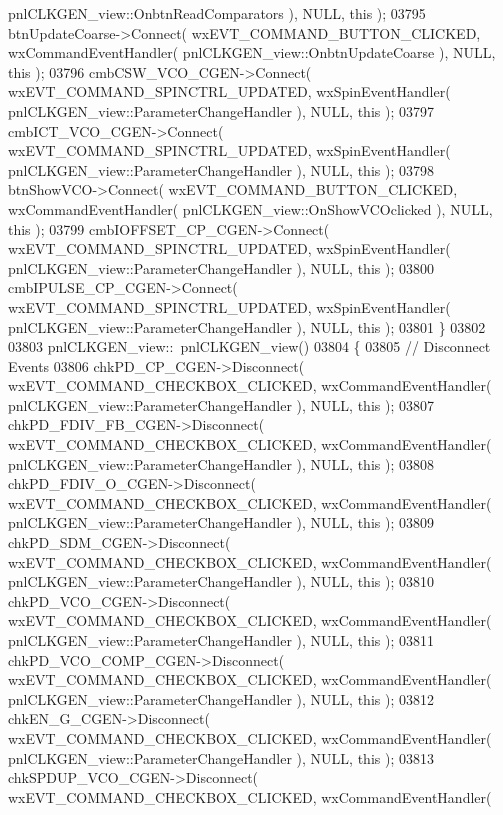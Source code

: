 \begin{DoxyCode}
      pnlCLKGEN_view::OnbtnReadComparators ), NULL, \textcolor{keyword}{this} );
03795     btnUpdateCoarse->Connect( wxEVT\_COMMAND\_BUTTON\_CLICKED, wxCommandEventHandler( 
      pnlCLKGEN_view::OnbtnUpdateCoarse ), NULL, \textcolor{keyword}{this} );
03796     cmbCSW_VCO_CGEN->Connect( wxEVT\_COMMAND\_SPINCTRL\_UPDATED, wxSpinEventHandler( 
      pnlCLKGEN_view::ParameterChangeHandler ), NULL, \textcolor{keyword}{this} );
03797     cmbICT_VCO_CGEN->Connect( wxEVT\_COMMAND\_SPINCTRL\_UPDATED, wxSpinEventHandler( 
      pnlCLKGEN_view::ParameterChangeHandler ), NULL, \textcolor{keyword}{this} );
03798     btnShowVCO->Connect( wxEVT\_COMMAND\_BUTTON\_CLICKED, wxCommandEventHandler( 
      pnlCLKGEN_view::OnShowVCOclicked ), NULL, \textcolor{keyword}{this} );
03799     cmbIOFFSET_CP_CGEN->Connect( wxEVT\_COMMAND\_SPINCTRL\_UPDATED, wxSpinEventHandler( 
      pnlCLKGEN_view::ParameterChangeHandler ), NULL, \textcolor{keyword}{this} );
03800     cmbIPULSE_CP_CGEN->Connect( wxEVT\_COMMAND\_SPINCTRL\_UPDATED, wxSpinEventHandler( 
      pnlCLKGEN_view::ParameterChangeHandler ), NULL, \textcolor{keyword}{this} );
03801 \}
03802 
03803 pnlCLKGEN_view::~pnlCLKGEN_view()
03804 \{
03805     \textcolor{comment}{// Disconnect Events}
03806     chkPD_CP_CGEN->Disconnect( wxEVT\_COMMAND\_CHECKBOX\_CLICKED, wxCommandEventHandler( 
      pnlCLKGEN_view::ParameterChangeHandler ), NULL, \textcolor{keyword}{this} );
03807     chkPD_FDIV_FB_CGEN->Disconnect( wxEVT\_COMMAND\_CHECKBOX\_CLICKED, wxCommandEventHandler( 
      pnlCLKGEN_view::ParameterChangeHandler ), NULL, \textcolor{keyword}{this} );
03808     chkPD_FDIV_O_CGEN->Disconnect( wxEVT\_COMMAND\_CHECKBOX\_CLICKED, wxCommandEventHandler( 
      pnlCLKGEN_view::ParameterChangeHandler ), NULL, \textcolor{keyword}{this} );
03809     chkPD_SDM_CGEN->Disconnect( wxEVT\_COMMAND\_CHECKBOX\_CLICKED, wxCommandEventHandler( 
      pnlCLKGEN_view::ParameterChangeHandler ), NULL, \textcolor{keyword}{this} );
03810     chkPD_VCO_CGEN->Disconnect( wxEVT\_COMMAND\_CHECKBOX\_CLICKED, wxCommandEventHandler( 
      pnlCLKGEN_view::ParameterChangeHandler ), NULL, \textcolor{keyword}{this} );
03811     chkPD_VCO_COMP_CGEN->Disconnect( wxEVT\_COMMAND\_CHECKBOX\_CLICKED, wxCommandEventHandler( 
      pnlCLKGEN_view::ParameterChangeHandler ), NULL, \textcolor{keyword}{this} );
03812     chkEN_G_CGEN->Disconnect( wxEVT\_COMMAND\_CHECKBOX\_CLICKED, wxCommandEventHandler( 
      pnlCLKGEN_view::ParameterChangeHandler ), NULL, \textcolor{keyword}{this} );
03813     chkSPDUP_VCO_CGEN->Disconnect( wxEVT\_COMMAND\_CHECKBOX\_CLICKED, wxCommandEventHandler( 

\end{DoxyCode}
